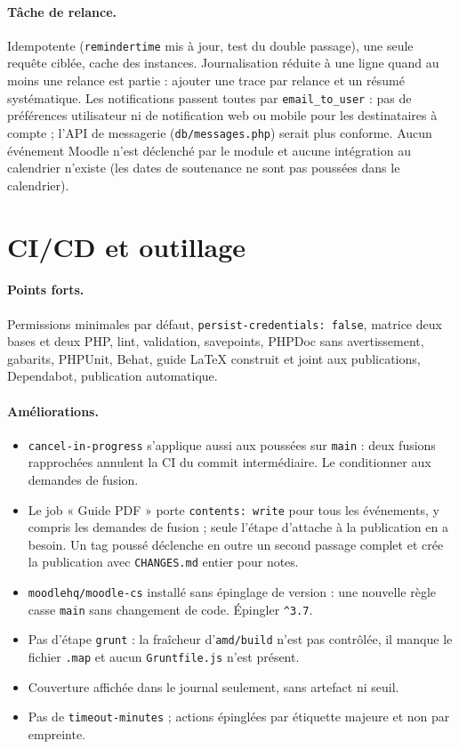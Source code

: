 \documentclass[11pt,a4paper]{article}
\newcommand{\fichier}[1]{\texttt{\small #1}}
\newcommand{\code}[1]{\texttt{#1}}
\begin{document}
\paragraph{Tâche de relance.}
Idempotente (\code{remindertime} mis à jour, test du double passage), une seule requête ciblée,
cache des instances. Journalisation réduite à une ligne quand au moins une relance est partie :
ajouter une trace par relance et un résumé systématique. Les notifications passent toutes par
\code{email\_to\_user} : pas de préférences utilisateur ni de notification web ou mobile pour
les destinataires à compte ; l'API de messagerie (\fichier{db/messages.php}) serait plus
conforme. Aucun événement Moodle n'est déclenché par le module et aucune intégration au
calendrier n'existe (les dates de soutenance ne sont pas poussées dans le calendrier).

\section{CI/CD et outillage}

\paragraph{Points forts.}
Permissions minimales par défaut, \code{persist-credentials: false}, matrice deux bases et deux
PHP, lint, validation, savepoints, PHPDoc sans avertissement, gabarits, PHPUnit, Behat, guide
LaTeX construit et joint aux publications, Dependabot, publication automatique.

\paragraph{Améliorations.}
\begin{itemize}
  \item \code{cancel-in-progress} s'applique aussi aux poussées sur \code{main} : deux fusions
    rapprochées annulent la CI du commit intermédiaire. Le conditionner aux demandes de fusion.
  \item Le job « Guide PDF » porte \code{contents: write} pour tous les événements, y compris les
    demandes de fusion ; seule l'étape d'attache à la publication en a besoin. Un tag poussé
    déclenche en outre un second passage complet et crée la publication avec
    \fichier{CHANGES.md} entier pour notes.
  \item \code{moodlehq/moodle-cs} installé sans épinglage de version : une nouvelle règle casse
    \code{main} sans changement de code. Épingler \code{\^{}3.7}.
  \item Pas d'étape \code{grunt} : la fraîcheur d'\fichier{amd/build} n'est pas contrôlée, il
    manque le fichier \code{.map} et aucun \fichier{Gruntfile.js} n'est présent.
  \item Couverture affichée dans le journal seulement, sans artefact ni seuil.
  \item Pas de \code{timeout-minutes} ; actions épinglées par étiquette majeure et non par
    empreinte.
\end{itemize}
\end{document}
